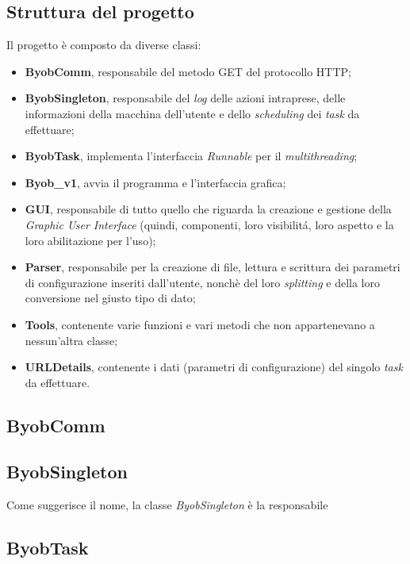 \subsection{Struttura del progetto}
Il progetto \`e composto da diverse classi:
\begin{itemize}
\item \textbf{ByobComm}, responsabile del metodo GET del protocollo HTTP;
\item \textbf{ByobSingleton}, responsabile del \textit{log} delle azioni intraprese, delle informazioni della macchina dell'utente e dello \textit{scheduling} dei \textit{task} da effettuare;
\item \textbf{ByobTask}, implementa l'interfaccia \textit{Runnable} per il \textit{multithreading};
\item \textbf{Byob\_v1}, avvia il programma e l'interfaccia grafica;
\item \textbf{GUI}, responsabile di tutto quello che riguarda la creazione e gestione della \textit{Graphic User Interface} (quindi, componenti, loro visibilit\'a, loro aspetto e la loro abilitazione per l'uso);
\item \textbf{Parser}, responsabile per la creazione di file, lettura e scrittura dei parametri di configurazione inseriti dall'utente, nonch\`e del loro \textit{splitting} e della loro conversione nel giusto tipo di dato;
\item \textbf{Tools}, contenente varie funzioni e vari metodi che non appartenevano a nessun'altra classe;
\item \textbf{URLDetails}, contenente i dati (parametri di configurazione) del singolo \textit{task} da effettuare.
\end{itemize} 

\vspace*{0.5cm}
\subsection{ByobComm}

\vspace*{0.5cm}
\subsection{ByobSingleton}
Come suggerisce il nome, la classe \textit{ByobSingleton} \`e la responsabile 

\vspace*{0.5cm}
\subsection{ByobTask}

